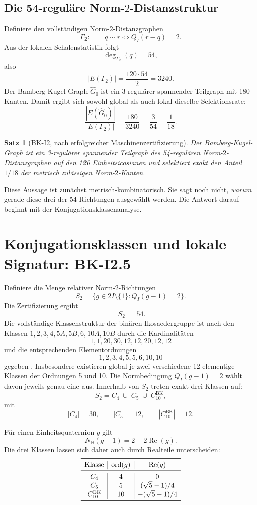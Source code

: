 \documentclass[11pt,a4paper]{article}
\newtheorem{satz}{Satz}[section]
\theoremstyle{definition}
\newcommand{\twoI}{2I}
\newcommand{\QI}{Q_I}
\begin{document}
\subsection{Die 54-reguläre Norm-\(2\)-Distanzstruktur}

Definiere den vollständigen Norm-\(2\)-Distanzgraphen
\[
\Gamma_2:
\qquad
q\sim r
\Longleftrightarrow
\QI(r-q)=2.
\]
Aus der lokalen Schalenstatistik folgt
\[
\deg_{\Gamma_2}(q)=54,
\]
also
\[
|E(\Gamma_2)|
=\frac{120\cdot54}{2}
=3240.
\]
Der Bamberg-Kugel-Graph \(\widehat G_0\) ist ein 3-regulärer spannender Teilgraph mit 180 Kanten. Damit ergibt sich sowohl global als auch lokal dieselbe Selektionsrate:
\[
\boxed{
\frac{|E(\widehat G_0)|}{|E(\Gamma_2)|}
=\frac{180}{3240}
=\frac{3}{54}
=\frac1{18}.
}
\]

\begin{satz}[BK-I2, nach erfolgreicher Maschinenzertifizierung]
Der Bamberg-Kugel-Graph ist ein 3-regulärer spannender Teilgraph des 54-regulären Norm-\(2\)-Distanzgraphen auf den 120 Einheitsicosianen und selektiert exakt den Anteil \(1/18\) der metrisch zulässigen Norm-\(2\)-Kanten.
\end{satz}

Diese Aussage ist zunächst metrisch-kombinatorisch. Sie sagt noch nicht, \emph{warum} gerade diese drei der 54 Richtungen ausgewählt werden. Die Antwort darauf beginnt mit der Konjugationsklassenanalyse.

\section{Konjugationsklassen und lokale Signatur: BK-I2.5}

Definiere die Menge relativer Norm-\(2\)-Richtungen
\[
S_2=
\{g\in\twoI\setminus\{1\}:\QI(g-1)=2\}.
\]
Die Zertifizierung ergibt
\[
|S_2|=54.
\]
Die vollständige Klassenstruktur der binären Ikosaedergruppe ist nach den Klassen $1,2,3,4,5A,5B,6,10A,10B$ durch die Kardinalitäten
\[
1,1,20,30,12,12,20,12,12
\]
und die entsprechenden Elementordnungen
\[
1,2,3,4,5,5,6,10,10
\]
gegeben \cite{nLab2I}. Insbesondere existieren global je zwei verschiedene 12-elementige Klassen der Ordnungen 5 und 10. Die Normbedingung $Q_I(g-1)=2$ wählt davon jeweils genau eine aus. Innerhalb von \(S_2\) treten exakt drei Klassen auf:
\[
\boxed{
S_2=C_4\;\dot\cup\;C_5\;\dot\cup\;C_{10}^{\mathrm{BK}},
}
\]
mit
\[
|C_4|=30,\qquad |C_5|=12,\qquad
|C_{10}^{\mathrm{BK}}|=12.
\]

Für einen Einheitsquaternion \(g\) gilt
\[
N_{\mathbb H}(g-1)=2-2\operatorname{Re}(g).
\]
Die drei Klassen lassen sich daher auch durch Realteile unterscheiden:
\[
\begin{array}{c|c|c}
\toprule
\text{Klasse} & \operatorname{ord}(g) & \operatorname{Re}(g)\\
\midrule
C_4 & 4 & 0\\
C_5 & 5 & (\sqrt5-1)/4\\
C_{10}^{\mathrm{BK}} & 10 & -(\sqrt5-1)/4\\
\bottomrule
\end{array}
\]
\end{document}
